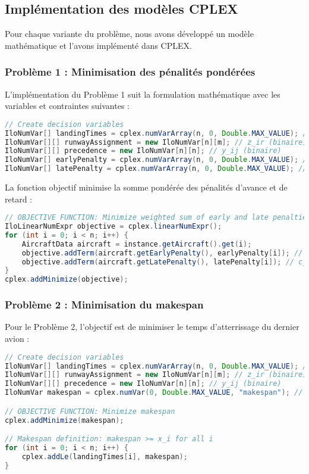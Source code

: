 \documentclass[a4paper,12pt]{report}
\begin{document}
\subsection{Implémentation des modèles CPLEX}
Pour chaque variante du problème, nous avons développé un modèle mathématique et l'avons implémenté dans CPLEX.

\subsubsection{Problème 1 : Minimisation des pénalités pondérées}
L'implémentation du Problème 1 suit la formulation mathématique avec les variables et contraintes suivantes :

\begin{lstlisting}[language=Java, caption=Extrait de Problem1Solver - Variables de décision]
// Create decision variables
IloNumVar[] landingTimes = cplex.numVarArray(n, 0, Double.MAX_VALUE); // x_i
IloNumVar[][] runwayAssignment = new IloNumVar[n][m]; // z_ir (binaire)
IloNumVar[][] precedence = new IloNumVar[n][n]; // y_ij (binaire)
IloNumVar[] earlyPenalty = cplex.numVarArray(n, 0, Double.MAX_VALUE); // α_i
IloNumVar[] latePenalty = cplex.numVarArray(n, 0, Double.MAX_VALUE); // β_i
\end{lstlisting}

La fonction objectif minimise la somme pondérée des pénalités d'avance et de retard :

\begin{lstlisting}[language=Java, caption=Extrait de Problem1Solver - Fonction objectif]
// OBJECTIVE FUNCTION: Minimize weighted sum of early and late penalties
IloLinearNumExpr objective = cplex.linearNumExpr();
for (int i = 0; i < n; i++) {
    AircraftData aircraft = instance.getAircraft().get(i);
    objective.addTerm(aircraft.getEarlyPenalty(), earlyPenalty[i]); // c_i^- * α_i
    objective.addTerm(aircraft.getLatePenalty(), latePenalty[i]); // c_i^+ * β_i
}
cplex.addMinimize(objective);
\end{lstlisting}

\subsubsection{Problème 2 : Minimisation du makespan}
Pour le Problème 2, l'objectif est de minimiser le temps d'atterrissage du dernier avion :

\begin{lstlisting}[language=Java, caption=Extrait de Problem2Solver - Fonction objectif]
// Create decision variables
IloNumVar[] landingTimes = cplex.numVarArray(n, 0, Double.MAX_VALUE); // x_i
IloNumVar[][] runwayAssignment = new IloNumVar[n][m]; // z_ir (binaire)
IloNumVar[][] precedence = new IloNumVar[n][n]; // y_ij (binaire)
IloNumVar makespan = cplex.numVar(0, Double.MAX_VALUE, "makespan"); // C_max

// OBJECTIVE FUNCTION: Minimize makespan
cplex.addMinimize(makespan);

// Makespan definition: makespan >= x_i for all i
for (int i = 0; i < n; i++) {
    cplex.addLe(landingTimes[i], makespan);
}
\end{lstlisting}
\end{document}
